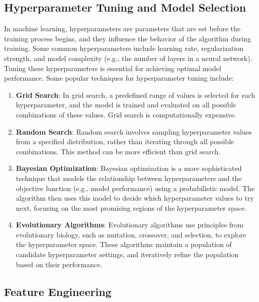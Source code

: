 \documentclass[12pt]{article}
\begin{document}
\subsection{Hyperparameter Tuning and Model Selection}
In machine learning, hyperparameters are parameters that are set before the training process begins, and they influence the behavior of the algorithm during training. Some common hyperparameters include learning rate, regularization strength, and model complexity (e.g., the number of layers in a neural network). Tuning these hyperparameters is essential for achieving optimal model performance. Some popular techniques for hyperparameter tuning include:

\begin{enumerate}
\item \textbf{Grid Search}: In grid search, a predefined range of values is selected for each hyperparameter, and the model is trained and evaluated on all possible combinations of these values. Grid search is computationally expensive.

\item \textbf{Random Search}: Random search involves sampling hyperparameter values from a specified distribution, rather than iterating through all possible combinations. This method can be more efficient than grid search.

\item \textbf{Bayesian Optimization}: Bayesian optimization is a more sophisticated technique that models the relationship between hyperparameters and the objective function (e.g., model performance) using a probabilistic model. The algorithm then uses this model to decide which hyperparameter values to try next, focusing on the most promising regions of the hyperparameter space.

\item \textbf{Evolutionary Algorithms}: Evolutionary algorithms use principles from evolutionary biology, such as mutation, crossover, and selection, to explore the hyperparameter space. These algorithms maintain a population of candidate hyperparameter settings, and iteratively refine the population based on their performance.
\end{enumerate}

\subsection{Feature Engineering}
\end{document}
